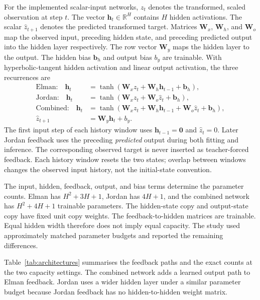 \documentclass[conference,10pt]{IEEEtran}
\begin{document}
For the implemented scalar-input networks, $z_t$ denotes the transformed, scaled observation at step $t$. The vector $\mathbf h_t\in\mathbb R^H$ contains $H$ hidden activations. The scalar $\hat z_{t+1}$ denotes the predicted transformed target. Matrices $\mathbf W_x$, $\mathbf W_h$, and $\mathbf W_o$ map the observed input, preceding hidden state, and preceding predicted output into the hidden layer respectively. The row vector $\mathbf W_y$ maps the hidden layer to the output. The hidden bias $\mathbf b_h$ and output bias $b_y$ are trainable. With hyperbolic-tangent hidden activation and linear output activation, the three recurrences are
\begin{align}
\text{Elman:}\quad \mathbf h_t & = \tanh(\mathbf W_x z_t+\mathbf W_h\mathbf h_{t-1}+\mathbf b_h),\\
\text{Jordan:}\quad \mathbf h_t & = \tanh(\mathbf W_x z_t+\mathbf W_o\hat z_t+\mathbf b_h),\\
\text{Combined:}\quad \mathbf h_t & = \tanh(\mathbf W_x z_t+\mathbf W_h\mathbf h_{t-1}
 +\mathbf W_o\hat z_t+\mathbf b_h),\\
\hat z_{t+1} & = \mathbf W_y\mathbf h_t+b_y.
\end{align}
The first input step of each history window uses $\mathbf h_{t-1}=\mathbf 0$ and $\hat z_t=0$. Later Jordan feedback uses the preceding \emph{predicted} output during both fitting and inference. The corresponding observed target is never inserted as teacher-forced feedback. Each history window resets the two states; overlap between windows changes the observed input history, not the initial-state convention.

The input, hidden, feedback, output, and bias terms determine the parameter counts. Elman has $H^2+3H+1$, Jordan has $4H+1$, and the combined network has $H^2+4H+1$ trainable parameters. The hidden-state copy and output-state copy have fixed unit copy weights. The feedback-to-hidden matrices are trainable. Equal hidden width therefore does not imply equal capacity. The study used approximately matched parameter budgets and reported the remaining differences.

Table~\ref{tab:architectures} summarises the feedback paths and the exact counts at the two capacity settings. The combined network adds a learned output path to Elman feedback. Jordan uses a wider hidden layer under a similar parameter budget because Jordan feedback has no hidden-to-hidden weight matrix.


\end{document}
